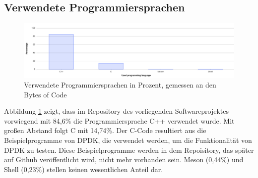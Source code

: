 \documentclass[../review_3.tex]{subfiles}
\begin{document}
\subsection{Verwendete Programmiersprachen}
\begin{figure} [h]
    \centering
    \includegraphics[width =0.95\linewidth]{img/gitlab1.png}
    \caption{Verwendete Programmiersprachen in Prozent, gemessen an den Bytes of Code}
    \label{gitlab1}
\end{figure}
Abbildung \ref{gitlab1} zeigt, dass im Repository des vorliegenden Softwareprojektes  vorwiegend mit 84,6\% die Programmiersprache C++ verwendet wurde. Mit großen Abstand folgt C mit 14,74\%. Der C-Code resultiert aus die Beispielprogramme von DPDK, die verwendet werden, um die Funktionalität von DPDK zu testen. Diese Beispielprogramme werden in dem Repoisitory, das später auf Github veröffentlicht wird, nicht mehr vorhanden sein. Meson (0,44\%) und Shell (0,23\%) stellen keinen wesentlichen Anteil dar.
\end{document}
